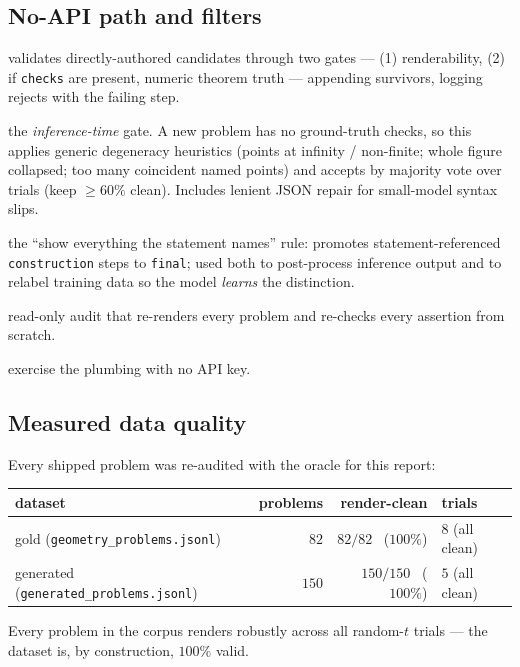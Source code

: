 \documentclass[11pt]{article}
\newcommand{\code}[1]{\texttt{\small #1}}
\begin{document}
\subsection{No-API path and filters}
\begin{description}[style=nextline,leftmargin=1.2em,nosep]
  \item[\texttt{validate\_candidates.py}] validates directly-authored candidates
    through two gates --- (1) renderability, (2) if \code{checks} are present,
    numeric theorem truth --- appending survivors, logging rejects with the
    failing step.
  \item[\texttt{post\_filter.py}] the \emph{inference-time} gate. A new problem
    has no ground-truth checks, so this applies generic degeneracy heuristics
    (points at infinity / non-finite; whole figure collapsed; too many coincident
    named points) and accepts by majority vote over trials (keep $\ge 60\%$
    clean). Includes lenient JSON repair for small-model syntax slips.
  \item[\texttt{visibility.py}] the ``show everything the statement names'' rule:
    promotes statement-referenced \code{construction} steps to \code{final}; used
    both to post-process inference output and to relabel training data so the
    model \emph{learns} the distinction.
  \item[\texttt{verify\_dataset.py}] read-only audit that re-renders every
    problem and re-checks every assertion from scratch.
  \item[\texttt{selftest.py}, \texttt{post\_filter\_selftest.py}] exercise the
    plumbing with no API key.
\end{description}

\subsection{Measured data quality}
Every shipped problem was re-audited with the oracle for this report:
\begin{center}
\begin{tabular}{@{}lrrl@{}}
\toprule
\textbf{dataset} & \textbf{problems} & \textbf{render-clean} & \textbf{trials}\\
\midrule
gold (\code{geometry\_problems.jsonl})      & $82$  & $82/82$ \ ($100\%$) & $8$ (all clean)\\
generated (\code{generated\_problems.jsonl})& $150$ & $150/150$ \ ($100\%$) & $5$ (all clean)\\
\bottomrule
\end{tabular}
\end{center}
\noindent Every problem in the corpus renders robustly across all random-$t$
trials --- the dataset is, by construction, $100\%$ valid.
\end{document}
